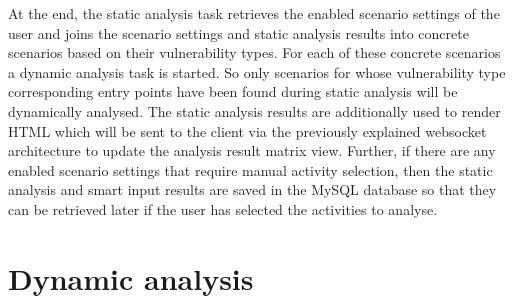 \documentclass[draft,final]{vutinfth} %
\begin{document}
At the end, the static analysis task retrieves the enabled scenario settings of the user and joins the scenario settings and static analysis results into concrete scenarios based on their vulnerability types. For each of these concrete scenarios a dynamic analysis task is started. So only scenarios for whose vulnerability type corresponding entry points have been found during static analysis will be dynamically analysed. The static analysis results are additionally used to render HTML which will be sent to the client via the previously explained websocket architecture to update the analysis result matrix view. Further, if there are any enabled scenario settings that require manual activity selection, then the static analysis and smart input results are saved in the MySQL database so that they can be retrieved later if the user has selected the activities to analyse.

\section*{Dynamic analysis}
\end{document}
